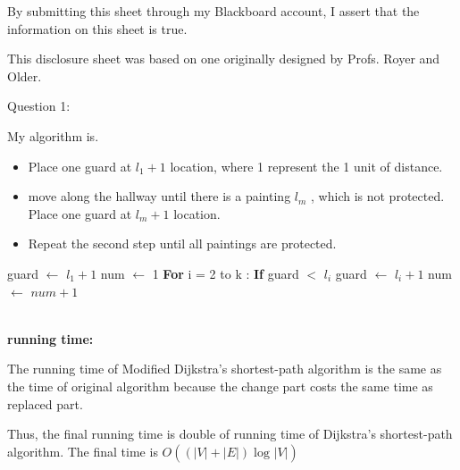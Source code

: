 \documentclass[12pt]{article}
\begin{document}
By submitting this sheet through my Blackboard account, I assert that the information on this sheet is true.


\hfill {\tiny This disclosure sheet was based on one originally designed
  by
  Profs. Royer and Older.}


\pagebreak
\noindent
\large Question 1: \vspace{5mm} \par
\normalsize 
My algorithm is.
\begin{itemize}
  \item	Place one guard at $l_1 + 1$ location, where 1 represent the 1 unit of distance. 
  \item move along the hallway until there is a painting $l_m$ , which is not protected. Place one guard at $l_m + 1$ location.
  \item Repeat the second step until all paintings are protected. 
\end{itemize}

\begin{algorithm}
\begin{algorithmic}
\State guard $\leftarrow$ $l_1 + 1$
\State num $\leftarrow$ 1
\State \hspace{0.4cm} \textbf{For} i = 2 to k :
\State \hspace{0.8cm} \textbf{If} guard $<$ $l_i$
\State \hspace{1.2cm} \textbf{} guard $\leftarrow$ $l_i + 1$
\State \hspace{1.2cm} \textbf{} num $\leftarrow$ $num + 1$
\end{algorithmic}
\end{algorithm}
\noindent \\
\textbf{running time:} \par
The running time of Modified Dijkstra’s shortest-path algorithm is the same as the time of original algorithm because the change part costs the same time as replaced part. \par
Thus, the final running time is double of running time of Dijkstra’s shortest-path algorithm. 
The final time is $O((|V| + |E|)\log_{}{|V|})$
\end{document}
